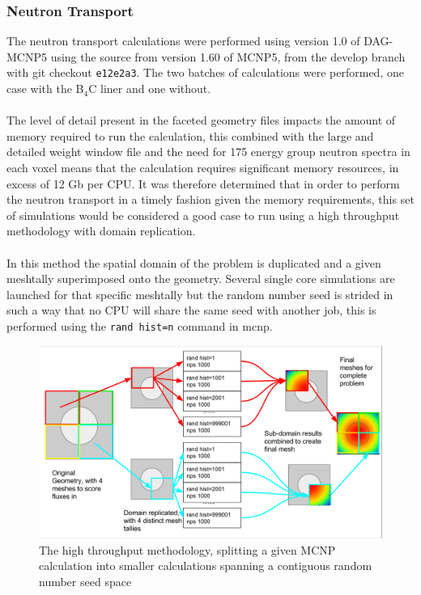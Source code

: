 \documentclass[12pt]{article}
\begin{document}
\subsubsection{Neutron Transport}
The neutron transport calculations were performed using version 1.0 of DAG-MCNP5
using the source from version 1.60 of MCNP5, from the develop branch with git
checkout \texttt{e12e2a3}. The two batches of calculations were performed, one
case with the B$_4$C liner and one without.
\\
\\
The level of detail present in the faceted geometry files impacts the amount of
memory required to run the calculation, this combined with the large and
detailed weight window file and the need for 175 energy group neutron spectra
in each voxel means that the calculation requires significant memory resources,
in excess of 12 Gb per CPU. It was therefore determined that in order to perform
the neutron transport in a timely fashion given the memory requirements, this
set of simulations would be considered a good case to run using a high
throughput methodology with domain replication.
\\
\\
In this method the spatial domain of the problem is duplicated and a given
meshtally superimposed onto the geometry. Several single core simulations are
launched for that specific meshtally but the random number seed is strided in
such a way that no CPU will share the same seed with another job, this is
performed using the \texttt{rand hist=n} command in \gls{mcnp}.
\begin{figure}[ht!]
  \centering
  \includegraphics[scale=0.3]{../plots/method/neutron_method.png}
  \caption{The high throughput methodology, splitting a given MCNP calculation
           into smaller calculations spanning a contiguous random number seed
           space}
  \label{fig:mesh_spliting}
\end{figure}
\end{document}
